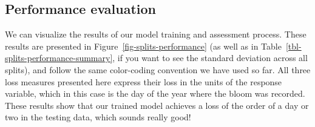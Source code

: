 \documentclass[
  letterpaper,
]{scrbook}
\begin{document}
\subsection{Performance evaluation}\label{performance-evaluation}

We can visualize the results of our model training and assessment
process. These results are presented in
Figure~\ref{fig-splits-performance} (as well as in
Table~\ref{tbl-splits-performance-summary}, if you want to see the
standard deviation across all splits), and follow the same color-coding
convention we have used so far. All three loss measures presented here
express their loss in the units of the response variable, which in this
case is the day of the year where the bloom was recorded. These results
show that our trained model achieves a loss of the order of a day or two
in the testing data, which sounds really good!

{
\makeatletter
\def\LT@makecaption#1#2#3{%
  \noalign{\smash{\hbox{\kern\textwidth\rlap{\kern\marginparsep
  \parbox[t]{\marginparwidth}{%
    \footnotesize{%
      \vspace{(1.1\baselineskip)}
    #1{#2: }\ignorespaces #3}}}}}}%
    }
\makeatother

\begin{figure}[bt]



\end{figure}%

}
\end{document}
